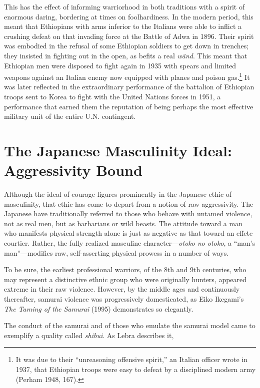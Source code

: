This has the effect of informing warriorhood in both traditions with a spirit of enormous daring, bordering at times on foolhardiness. In the modern period, this meant that Ethiopians with arms inferior to the Italians were able to inflict a crushing defeat on that invading force at the Battle of Adwa in 1896. Their spirit was embodied in the refusal of some Ethiopian soldiers to get down in trenches; they insisted in fighting out in the open, as befits a real \emph{w\"{a}nd}. This meant that Ethiopian men were disposed to fight again in 1935 with spears and limited weapons against an Italian enemy now equipped with planes and poison gas.\footnote{It was due to their ``unreasoning offensive spirit,'' an Italian officer wrote in 1937, that Ethiopian troops were easy to defeat by a disciplined modern army (Perham 1948, 167).} It was later reflected in the extraordinary performance of the battalion of Ethiopian troops sent to Korea to fight with the United Nations forces in 1951, a performance that earned them the reputation of being perhaps the most effective military unit of the entire U.N. contingent. 

\section*{The Japanese Masculinity Ideal: Aggressivity Bound}

Although the ideal of courage figures prominently in the Japanese ethic of masculinity, that ethic has come to depart from a notion of raw aggressivity. The Japanese have traditionally referred to those who behave with untamed violence, not as real men, but as barbarians or wild beasts. The attitude toward a man who manifests physical strength alone is just as negative as that toward an effete courtier. Rather, the fully realized masculine character---\emph{otoko no otoko}, a ``man's man''---modifies raw, self-asserting physical prowess in a number of ways. 

To be sure, the earliest professional warriors, of the 8th and 9th centuries, who may represent a distinctive ethnic group who were originally hunters, appeared extreme in their raw violence. However, by the middle ages and continuously thereafter, samurai violence was progressively domesticated, as Eiko Ikegami's \emph{The Taming of the Samurai} (1995) demonstrates so elegantly. 

The conduct of the samurai and of those who emulate the samurai model came to exemplify a quality called \emph{shibui}. As Lebra describes it, 

